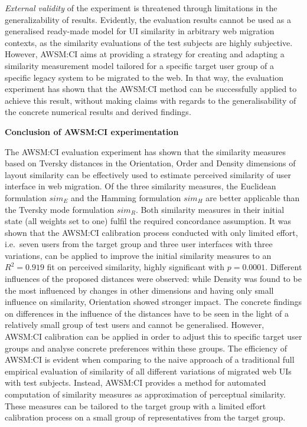 \emph{External validity} of the experiment is threatened through limitations in the generalizability of results.
Evidently, the evaluation results cannot be used as a generalised ready-made model for UI similarity in arbitrary web migration contexts, as the similarity evaluations of the test subjects are highly subjective.
However, AWSM:CI aims at providing a strategy for creating and adapting a similarity measurement model tailored for a specific target user group of a specific legacy system to be migrated to the web.
In that way, the evaluation experiment has shown that the AWSM:CI method can be successfully applied to achieve this result, without making claims with regards to the generalisability of the concrete numerical results and derived findings.

\textbf{Conclusion of AWSM:CI experimentation}

The AWSM:CI evaluation experiment has shown that the similarity measures based on Tversky distances in the Orientation, Order and Density dimensions of layout similarity can be effectively used to estimate perceived similarity of user interface in web migration.
Of the three similarity measures, the Euclidean formulation \(sim_E\) and the Hamming formulation \(sim_H\) are better applicable than the Tversky mode formulation \(sim_R\).
Both similarity measures in their initial state (all weights set to one) fulfil the required concordance assumption.
It was shown that the AWSM:CI calibration process conducted with only limited effort, i.e.~seven users from the target group and three user interfaces with three variations, can be applied to improve the initial similarity measures to an \(R^2=0.919\) fit on perceived similarity, highly significant with \(p=0.0001\).
Different influences of the proposed distances were observed: while Density was found to be the most influenced by changes in other dimensions and having only small influence on similarity, Orientation showed stronger impact.
The concrete findings on differences in the influence of the distances have to be seen in the light of a relatively small group of test users and cannot be generalised.
However, AWSM:CI calibration can be applied in order to adjust this to specific target user groups and analyse concrete preferences within these groups.
The efficiency of AWSM:CI is evident when comparing to the naive approach of a traditional full empirical evaluation of similarity of all different variations of migrated web UIs with test subjects.
Instead, AWSM:CI provides a method for automated computation of similarity measures as approximation of perceptual similarity.
These measures can be tailored to the target group with a limited effort calibration process on a small group of representatives from the target group.

